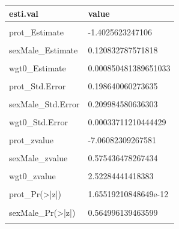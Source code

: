 \documentclass[
]{book}
\begin{document}
\begin{table}[!h]
\centering
\begin{tabular}{l|l}
\hline
esti.val & value\\
\hline
\cellcolor{gray!6}{(Intercept)\_Estimate} & \cellcolor{gray!6}{44.0243196254297}\\
\hline
prot\_Estimate & -1.4025623247106\\
\hline
\cellcolor{gray!6}{cal\_Estimate} & \cellcolor{gray!6}{0.065104895750151}\\
\hline
sexMale\_Estimate & 0.120832787571818\\
\hline
\cellcolor{gray!6}{hgt0\_Estimate} & \cellcolor{gray!6}{0.286525437984517}\\
\hline
wgt0\_Estimate & 0.000850481389651033\\
\hline
\cellcolor{gray!6}{(Intercept)\_Std.Error} & \cellcolor{gray!6}{2.75354847244082}\\
\hline
prot\_Std.Error & 0.198640060273635\\
\hline
\cellcolor{gray!6}{cal\_Std.Error} & \cellcolor{gray!6}{0.00758881298880996}\\
\hline
sexMale\_Std.Error & 0.209984580636303\\
\hline
\cellcolor{gray!6}{hgt0\_Std.Error} & \cellcolor{gray!6}{0.0707828182888255}\\
\hline
wgt0\_Std.Error & 0.00033711210444429\\
\hline
\cellcolor{gray!6}{(Intercept)\_zvalue} & \cellcolor{gray!6}{15.9882130516502}\\
\hline
prot\_zvalue & -7.06082309267581\\
\hline
\cellcolor{gray!6}{cal\_zvalue} & \cellcolor{gray!6}{8.57906181719737}\\
\hline
sexMale\_zvalue & 0.575436478267434\\
\hline
\cellcolor{gray!6}{hgt0\_zvalue} & \cellcolor{gray!6}{4.04795181812859}\\
\hline
wgt0\_zvalue & 2.52284441418383\\
\hline
\cellcolor{gray!6}{(Intercept)\_Pr(>|z|)} & \cellcolor{gray!6}{1.54396598126854e-57}\\
\hline
prot\_Pr(>|z|) & 1.65519210848649e-12\\
\hline
\cellcolor{gray!6}{cal\_Pr(>|z|)} & \cellcolor{gray!6}{9.56500648203187e-18}\\
\hline
sexMale\_Pr(>|z|) & 0.564996139463599\\
\hline
\cellcolor{gray!6}{hgt0\_Pr(>|z|)} & \cellcolor{gray!6}{5.16677787108928e-05}\\

\end{tabular}
\end{table}
\end{document}
